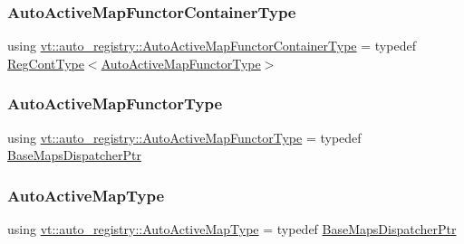 \mbox{\label{namespacevt_1_1auto__registry_a531e799a0af154cbf069df74aec0f765}} 
\subsubsection{\texorpdfstring{Auto\+Active\+Map\+Functor\+Container\+Type}{AutoActiveMapFunctorContainerType}}
{\footnotesize\ttfamily using \hyperlink{namespacevt_1_1auto__registry_a531e799a0af154cbf069df74aec0f765}{vt\+::auto\+\_\+registry\+::\+Auto\+Active\+Map\+Functor\+Container\+Type} = typedef \hyperlink{namespacevt_1_1auto__registry_a988a4943e4c8fe82b56f5b13bddceb2b}{Reg\+Cont\+Type}$<$\hyperlink{namespacevt_1_1auto__registry_a05a587ebd105ed89932361888de7e4ae}{Auto\+Active\+Map\+Functor\+Type}$>$}

\mbox{\label{namespacevt_1_1auto__registry_a05a587ebd105ed89932361888de7e4ae}} 
\subsubsection{\texorpdfstring{Auto\+Active\+Map\+Functor\+Type}{AutoActiveMapFunctorType}}
{\footnotesize\ttfamily using \hyperlink{namespacevt_1_1auto__registry_a05a587ebd105ed89932361888de7e4ae}{vt\+::auto\+\_\+registry\+::\+Auto\+Active\+Map\+Functor\+Type} = typedef \hyperlink{namespacevt_1_1auto__registry_aacf403872e2d1ae4d749738c02904c01}{Base\+Maps\+Dispatcher\+Ptr}}

\mbox{\label{namespacevt_1_1auto__registry_ae1bc8f9afc86cc589761fbbf22064601}} 
\subsubsection{\texorpdfstring{Auto\+Active\+Map\+Type}{AutoActiveMapType}}
{\footnotesize\ttfamily using \hyperlink{namespacevt_1_1auto__registry_ae1bc8f9afc86cc589761fbbf22064601}{vt\+::auto\+\_\+registry\+::\+Auto\+Active\+Map\+Type} = typedef \hyperlink{namespacevt_1_1auto__registry_aacf403872e2d1ae4d749738c02904c01}{Base\+Maps\+Dispatcher\+Ptr}}

